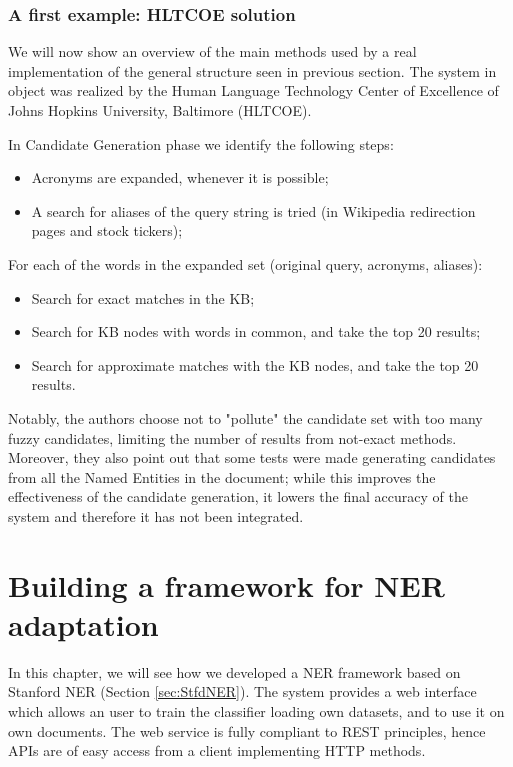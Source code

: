 \documentclass[a4paper,11pt]{report}
\begin{document}
\subsection{A first example: HLTCOE solution}
We will now show an overview of the main methods used by a real implementation of the general structure seen in previous section. The system in object was realized by the Human Language Technology Center of Excellence of Johns Hopkins University, Baltimore (HLTCOE).

In Candidate Generation phase we identify the following steps:
\begin{itemize}
\item Acronyms are expanded, whenever it is possible;
\item A search for aliases of the query string is tried (in Wikipedia redirection pages and stock tickers);
\end{itemize}

For each of the words in the expanded set (original query, acronyms, aliases):
\begin{itemize}

\item Search for exact matches in the KB;
\item Search for KB nodes with words in common, and take the top 20 results;
\item Search for approximate matches with the KB nodes, and take the top 20 results.
\end{itemize}

Notably, the authors choose not to "pollute" the candidate set with too many fuzzy candidates, limiting the number of results from not-exact methods. Moreover, they also point out that some tests were made generating candidates from all the Named Entities in the document; while this improves the effectiveness of the candidate generation, it lowers the final accuracy of the system and therefore it has not been integrated.



\chapter{Building a framework for NER adaptation}

In this chapter, we will see how we developed a NER framework based on Stanford NER (Section \ref{sec:StfdNER}). The system provides a web interface which allows an user to train the classifier loading own datasets, and to use it on own documents. %
The web service is fully compliant to REST principles, %
hence APIs are of easy access from a client implementing HTTP methods. 
\end{document}
